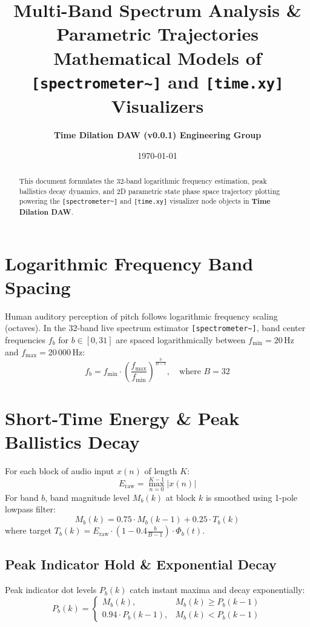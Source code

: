 \documentclass[11pt,a4paper]{article}
\title{\textbf{\Huge Multi-Band Spectrum Analysis \& Parametric Trajectories}\\[0.5em]
\Large Mathematical Models of \texttt{[spectrometer\textasciitilde{}]} and \texttt{[time.xy]} Visualizers}
\author{\textbf{Time Dilation DAW (v0.0.1) Engineering Group}}
\date{\today}
\begin{document}
\maketitle

\begin{abstract}
This document formulates the 32-band logarithmic frequency estimation, peak ballistics decay dynamics, and 2D parametric state phase space trajectory plotting powering the \texttt{[spectrometer\textasciitilde{}]} and \texttt{[time.xy]} visualizer node objects in \textbf{Time Dilation DAW}.
\end{abstract}

\section{Logarithmic Frequency Band Spacing}
Human auditory perception of pitch follows logarithmic frequency scaling (octaves). In the 32-band live spectrum estimator \texttt{[spectrometer\textasciitilde{}]}, band center frequencies $f_b$ for $b \in [0, 31]$ are spaced logarithmically between $f_{\text{min}} = 20\,\text{Hz}$ and $f_{\text{max}} = 20\,000\,\text{Hz}$:
\begin{equation}
f_b = f_{\text{min}} \cdot \left( \frac{f_{\text{max}}}{f_{\text{min}}} \right)^{\frac{b}{B-1}}, \quad \text{where } B = 32
\end{equation}

\section{Short-Time Energy \& Peak Ballistics Decay}
For each block of audio input $x(n)$ of length $K$:
\begin{equation}
E_{\text{raw}} = \max_{n=0}^{K-1} |x(n)|
\end{equation}
For band $b$, band magnitude level $M_b(k)$ at block $k$ is smoothed using 1-pole lowpass filter:
\begin{equation}
M_b(k) = 0.75 \cdot M_b(k-1) + 0.25 \cdot T_b(k)
\end{equation}
where target $T_b(k) = E_{\text{raw}} \cdot \left(1 - 0.4 \frac{b}{B-1}\right) \cdot \Phi_b(t)$.

\subsection{Peak Indicator Hold \& Exponential Decay}
Peak indicator dot levels $P_b(k)$ catch instant maxima and decay exponentially:
\begin{equation}
P_b(k) =
\begin{cases}
M_b(k), & M_b(k) \ge P_b(k-1) \\
0.94 \cdot P_b(k-1), & M_b(k) < P_b(k-1)
\end{cases}
\end{equation}
\end{document}
